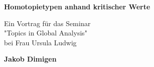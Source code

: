 \documentclass[a4paper,11pt]{article}
\begin{document}
\begin{titlepage}
    \begin{center}
        \vspace*{1cm}
 
        \Large{\textbf{Homotopietypen anhand kritischer Werte}}
 
        \vspace{0.5cm}
        Ein Vortrag für das Seminar \\ 
        "Topics in Global Analysis" \\
        bei Frau Ursula Ludwig
             
        \vspace{1.5cm}
 
        \textbf{Jakob Dimigen}
             
    \end{center}
\end{titlepage}








\end{document}
